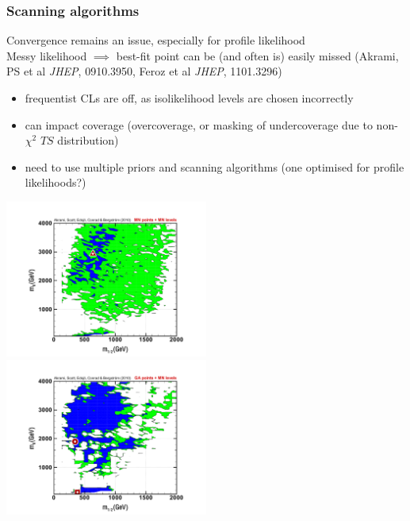 \documentclass[xcolor=dvipsnames]{beamer}
\newcommand{\cblue}[1]{{\color[rgb]{0.1, 0.0, 0.6} #1}}
\begin{document}
\begin{frame}
\frametitle{Scanning algorithms}

\cblue{Convergence remains an issue, especially for profile likelihood}\\
Messy likelihood $\implies$ best-fit point can be (and often is) easily missed {\tiny(Akrami, PS et al {\it JHEP}, 0910.3950, Feroz et al {\it JHEP}, 1101.3296)}
      \begin{itemize}\footnotesize
                 \item frequentist CLs are off, as isolikelihood levels are chosen incorrectly
                 \item can impact coverage (overcoverage, or masking of undercoverage due to non-$\chi^2$ $TS$ distribution)
                 \item need to use multiple priors and scanning algorithms (one optimised for profile likelihoods?)  
      \end{itemize}\vspace{-2mm}
\includegraphics[width=0.5\textwidth]{MN_m0mhf_MNlevels}	
\includegraphics[width=0.5\textwidth]{GA_m0mhf_MNlevels}	


\end{frame}
\end{document}
